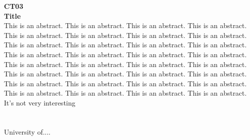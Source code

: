 \begin{multicols}{2}
\noindent\textbf{CT03}\\
\textbf{Title}\\
This is an abstract. This is an abstract. This is an abstract. This is an abstract. This is an abstract. This is an abstract. This is an abstract. This is an abstract. This is an abstract. This is an abstract. This is an abstract. This is an abstract. This is an abstract. This is an abstract. This is an abstract. This is an abstract. This is an abstract. This is an abstract. This is an abstract. This is an abstract. This is an abstract. This is an abstract. This is an abstract. This is an abstract. This is an abstract. This is an abstract. This is an abstract. This is an abstract. This is an abstract. This is an abstract. This is an abstract. This is an abstract. \\It's not very interesting\\\\
\\
University of....\\
\\\\
\end{multicols}


